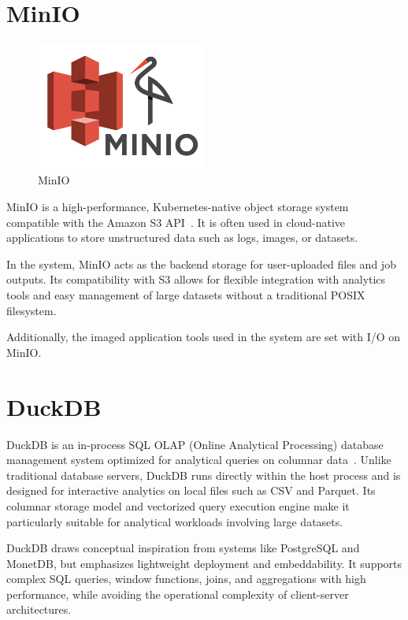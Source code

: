 \section{MinIO}

\begin{figure}[h!]
  \centering
  \includegraphics[width=0.5\textwidth]{Images/minIO.png}
  \caption{MinIO}
  \label{fig:minio}
\end{figure}

MinIO is a high-performance, Kubernetes-native object storage system compatible with the Amazon S3 API~\cite{minio-docs}. 
It is often used in cloud-native applications to store unstructured data such as logs, images, or datasets.

In the system, MinIO acts as the backend storage for user-uploaded files and job outputs. Its compatibility with S3 allows for flexible 
integration with analytics tools and easy management of large datasets without a traditional POSIX filesystem. 

Additionally, the imaged application tools used in the system are set with I/O on MinIO.
\section{DuckDB}

DuckDB is an in-process SQL OLAP (Online Analytical Processing) database management system optimized for analytical queries on 
columnar data~\cite{duckdb-paper}. Unlike traditional database servers, DuckDB runs directly within the host process and is designed for interactive 
analytics on local files such as CSV and Parquet. Its columnar storage model and vectorized query execution engine make it particularly 
suitable for analytical workloads involving large datasets.

DuckDB draws conceptual inspiration from systems like PostgreSQL and MonetDB, but emphasizes lightweight deployment and embeddability. 
It supports complex SQL queries, window functions, joins, and aggregations with high performance, while avoiding the operational 
complexity of client-server architectures.

